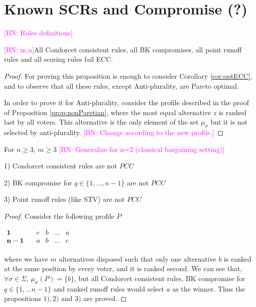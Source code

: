\documentclass[version=3.21, pagesize, notitlepage, twoside=off, bibliography=totoc, DIV=calc, fontsize=11pt, a4paper]{scrartcl}
\newcommand{\commentBN}[1]{\textcolor{magenta}{\small$\big[$BN: #1$\big]$}}
\newcommand{\musigma}{\mu_{\sigma}}
\begin{document}
\section{Known SCRs and Compromise (?)}
\commentBN{Rules definitions}
\begin{proposition}
	\commentBN{m,n}All Condorcet consistent rules, all BK compromises, all point runoff rules and all scoring rules fail ECC.
\end{proposition}
\begin{proof}
	For proving this proposition is enough to consider Corollary \ref{cor:optECC}, and to observe that all these rules, except Anti-plurality, are Pareto optimal.
	
	In order to prove it for Anti-plurality, consider the profile described in the proof of Proposition \ref{prop:nonParetian}, where the most equal alternative $z$ is ranked last by all voters. This alternative is the only element of the set $\musigma$ but it is not selected by anti-plurality. \commentBN{Change according to the new profile.}%
\end{proof}

\begin{proposition} For $n\geq3$, $m\geq3$ \commentBN{Generalize for n=2 (classical bargaining setting)} \label{prop:rulesnotPCC}
	\begin{item}
		\item[1)] Condorcet consistent rules are not $PCC$
		\item[2)] BK compromise for $q \in \{1, \dots ,n-1\}$ are not $PCC$
		\item[3)] Point runoff rules (like STV) are not $PCC$
	\end{item}
\end{proposition}
\begin{proof}
	Consider the following profile $P$
	\begin{center}
		$
		\begin{array}{ccccc}
		\mathbf{1} \quad &c&b&\dots &a\\
		\mathbf{n-1} \quad &a&b&\dots &c\\		
		\end{array}
		$
	\end{center}
	where we have $m$ alternatives disposed such that only one alternative $b$ is ranked at the same position by every voter, and it is ranked second.
	We can see that, $\forall \sigma \in \Sigma$, $\musigma(P)=\{b\}$, but all Condorcet consistent rules, BK compromise for $q \in \{1, \dots n-1\}$ and ranked runoff rules would select $a$ as the winner. Thus the propositions $1), 2) \text{ and } 3)$ are proved. 
\end{proof}
\end{document}

